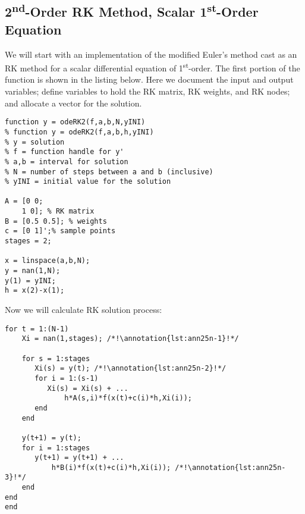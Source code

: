 \subsection{2\textsuperscript{nd}-Order RK Method, Scalar 1\textsuperscript{st}-Order Equation}
We will start with an implementation of the modified Euler's method cast as an RK method for a scalar differential equation of 1\textsuperscript{st}-order.  The first portion of the function is shown in the listing below. Here we document the input and output variables; define variables to hold the RK matrix, RK weights, and RK nodes; and allocate a vector for the solution.

\begin{lstlisting}[style=myMatlab,name=lec25n-1]
function y = odeRK2(f,a,b,N,yINI)
% function y = odeRK2(f,a,b,h,yINI)
% y = solution
% f = function handle for y'
% a,b = interval for solution
% N = number of steps between a and b (inclusive)
% yINI = initial value for the solution

A = [0 0;
    1 0]; % RK matrix
B = [0.5 0.5]; % weights
c = [0 1]';% sample points
stages = 2;

x = linspace(a,b,N);
y = nan(1,N);
y(1) = yINI;
h = x(2)-x(1);
\end{lstlisting}

\noindent Now we will calculate RK solution process:
\begin{lstlisting}[style=myMatlab,name=lec25n-1]
for t = 1:(N-1)
    Xi = nan(1,stages); /*!\annotation{lst:ann25n-1}!*/
    
    for s = 1:stages
       Xi(s) = y(t); /*!\annotation{lst:ann25n-2}!*/
       for i = 1:(s-1)
          Xi(s) = Xi(s) + ...
              h*A(s,i)*f(x(t)+c(i)*h,Xi(i)); 
       end
    end
    
    y(t+1) = y(t);
    for i = 1:stages
       y(t+1) = y(t+1) + ...
           h*B(i)*f(x(t)+c(i)*h,Xi(i)); /*!\annotation{lst:ann25n-3}!*/
    end    
end
end
\end{lstlisting}






